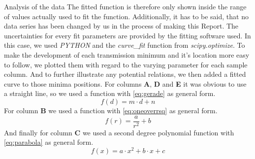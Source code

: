 \documentclass[pdftex, a4paper,11pt, twoside, UKenglish]{report}
\begin{document}
\begin{chapter}{Analysis of the data}
    The fitted function is therefore only shown inside the range of values
    actually used to fit the function. \newline
    Additionally, it has to be said, that no data series has been changed by us
    in the process of making this Report. The uncertainties for every fit
    parameters are provided by the fitting software used.
    In this case, we used \textit{PYTHON} and the \textit{curve\_fit} function
    from \textit{scipy.optimize}.
    To make the development of each transmission minimum and it's location more
    easy to follow, we plotted them with regard to the varying parameter for
    each sample column. And to further illustrate any potential relations, we
    then added a fitted curve to those minima positions.
    For columns \textbf{A}, \textbf{D} and \textbf{E} it was obvious to use a
    straight line, so we used a function with \cref{eq:gerade} as general form.
    \begin{equation}
      \label{eq:gerade}
      f(d) = m\cdot d + n
    \end{equation}
    For column \textbf{B} we used a function with \cref{eq:oneoverrsq} as
    general form.
    \begin{equation}
      \label{eq:oneoverrsq}
      f(r) = \frac{a}{r^{2}}+b
    \end{equation}
    And finally for column \textbf{C} we used a second degree polynomial
    function with \cref{eq:parabola} as general form.
    \begin{equation}
      \label{eq:parabola}
      f(x) = a\cdot x^{2} + b\cdot x + c
    \end{equation}
    
    
    

\end{chapter}
\end{document}
